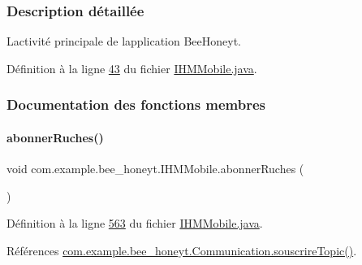 \subsubsection{Description détaillée}
L\textquotesingle{}activité principale de l\textquotesingle{}application Bee\+Honey\textquotesingle{}t. 

Définition à la ligne \hyperlink{_i_h_m_mobile_8java_source_l00043}{43} du fichier \hyperlink{_i_h_m_mobile_8java_source}{I\+H\+M\+Mobile.\+java}.



\subsubsection{Documentation des fonctions membres}
\mbox{\label{classcom_1_1example_1_1bee__honeyt_1_1_i_h_m_mobile_ac255143b5796de6ee0be9852d2b89396}} 
\paragraph{\texorpdfstring{abonner\+Ruches()}{abonnerRuches()}}
{\footnotesize\ttfamily void com.\+example.\+bee\+\_\+honeyt.\+I\+H\+M\+Mobile.\+abonner\+Ruches (\begin{DoxyParamCaption}{ }\end{DoxyParamCaption})\hspace{0.3cm}{\ttfamily [private]}}



Définition à la ligne \hyperlink{_i_h_m_mobile_8java_source_l00563}{563} du fichier \hyperlink{_i_h_m_mobile_8java_source}{I\+H\+M\+Mobile.\+java}.



Références \hyperlink{_communication_8java_source_l00232}{com.\+example.\+bee\+\_\+honeyt.\+Communication.\+souscrire\+Topic()}.


